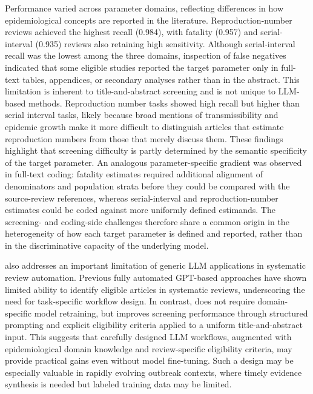 Performance varied across parameter domains, reflecting differences in how epidemiological concepts are reported in the literature. Reproduction-number reviews achieved the highest recall (0.984), with fatality (0.957) and serial-interval (0.935) reviews also retaining high sensitivity. Although serial-interval recall was the lowest among the three domains, inspection of false negatives indicated that some eligible studies reported the target parameter only in full-text tables, appendices, or secondary analyses rather than in the abstract. This limitation is inherent to title-and-abstract screening and is not unique to LLM-based methods. Reproduction number tasks showed high recall but higher \nns{} than serial interval tasks, likely because broad mentions of transmissibility and epidemic growth make it more difficult to distinguish articles that estimate reproduction numbers from those that merely discuss them. These findings highlight that screening difficulty is partly determined by the semantic specificity of the target parameter. An analogous parameter-specific gradient was observed in full-text coding: fatality estimates required additional alignment of denominators and population strata before they could be compared with the source-review references, whereas serial-interval and reproduction-number estimates could be coded against more uniformly defined estimands. The screening- and coding-side challenges therefore share a common origin in the heterogeneity of how each target parameter is defined and reported, rather than in the discriminative capacity of the underlying model.

\metagent{} also addresses an important limitation of generic LLM applications in systematic review automation. Previous fully automated GPT-based approaches have shown limited ability to identify eligible articles in systematic reviews, underscoring the need for task-specific workflow design. In contrast, \metagent{} does not require domain-specific model retraining, but improves screening performance through structured prompting and explicit eligibility criteria applied to a uniform title-and-abstract input. This suggests that carefully designed LLM workflows, augmented with epidemiological domain knowledge and review-specific eligibility criteria, may provide practical gains even without model fine-tuning. Such a design may be especially valuable in rapidly evolving outbreak contexts, where timely evidence synthesis is needed but labeled training data may be limited.

